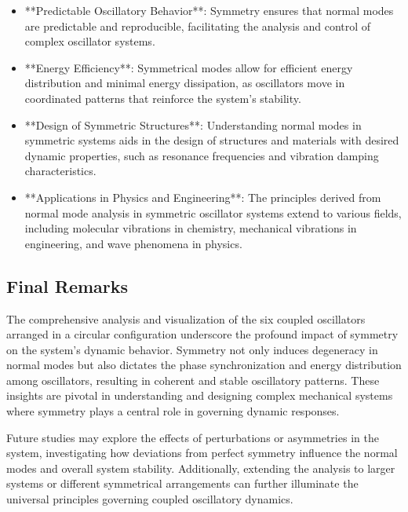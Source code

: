 \documentclass[12pt]{report} %
\begin{document}
\begin{itemize}
    \item **Predictable Oscillatory Behavior**: Symmetry ensures that normal modes are predictable and reproducible, facilitating the analysis and control of complex oscillator systems.
    
    \item **Energy Efficiency**: Symmetrical modes allow for efficient energy distribution and minimal energy dissipation, as oscillators move in coordinated patterns that reinforce the system's stability.
    
    \item **Design of Symmetric Structures**: Understanding normal modes in symmetric systems aids in the design of structures and materials with desired dynamic properties, such as resonance frequencies and vibration damping characteristics.
    
    \item **Applications in Physics and Engineering**: The principles derived from normal mode analysis in symmetric oscillator systems extend to various fields, including molecular vibrations in chemistry, mechanical vibrations in engineering, and wave phenomena in physics.
\end{itemize}

\subsection{Final Remarks}
\label{subsec:part5_final_remarks}

The comprehensive analysis and visualization of the six coupled oscillators arranged in a circular configuration underscore the profound impact of symmetry on the system's dynamic behavior. Symmetry not only induces degeneracy in normal modes but also dictates the phase synchronization and energy distribution among oscillators, resulting in coherent and stable oscillatory patterns. These insights are pivotal in understanding and designing complex mechanical systems where symmetry plays a central role in governing dynamic responses.

Future studies may explore the effects of perturbations or asymmetries in the system, investigating how deviations from perfect symmetry influence the normal modes and overall system stability. Additionally, extending the analysis to larger systems or different symmetrical arrangements can further illuminate the universal principles governing coupled oscillatory dynamics.
\end{document}
